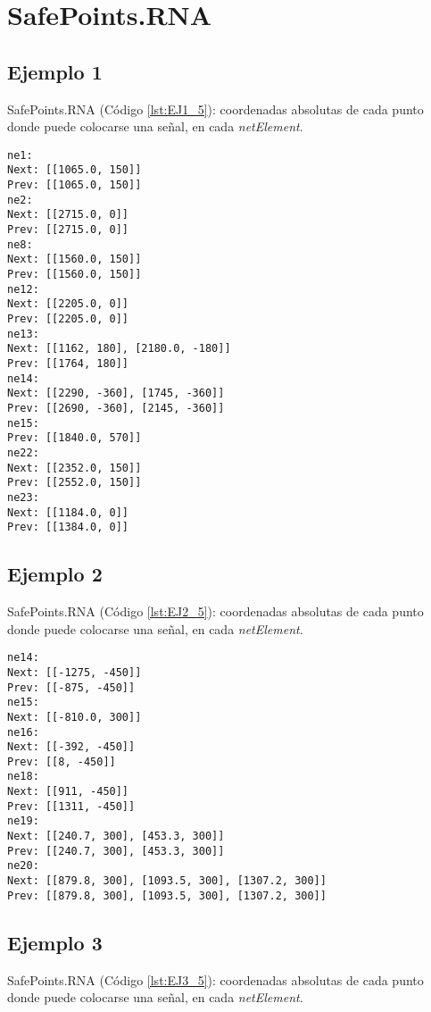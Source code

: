 \chapter{SafePoints.RNA}
	\label{sec:safePointsRNA}
	
	\section{Ejemplo 1}
		SafePoints.RNA (Código \ref{lst:EJ1_5}): coordenadas absolutas de cada punto donde puede colocarse una señal, en cada \textit{netElement}.
		
		\begin{lstlisting}[language = {}, caption = SafePoints.RNA, label = {lst:EJ1_5}]
ne1:
Next: [[1065.0, 150]]
Prev: [[1065.0, 150]]
ne2:
Next: [[2715.0, 0]]
Prev: [[2715.0, 0]]
ne8:
Next: [[1560.0, 150]]
Prev: [[1560.0, 150]]
ne12:
Next: [[2205.0, 0]]
Prev: [[2205.0, 0]]
ne13:
Next: [[1162, 180], [2180.0, -180]]
Prev: [[1764, 180]]
ne14:
Next: [[2290, -360], [1745, -360]]
Prev: [[2690, -360], [2145, -360]]
ne15:
Prev: [[1840.0, 570]]
ne22:
Next: [[2352.0, 150]]
Prev: [[2552.0, 150]]
ne23:
Next: [[1184.0, 0]]
Prev: [[1384.0, 0]]
		\end{lstlisting}	
	\section{Ejemplo 2}
	SafePoints.RNA (Código \ref{lst:EJ2_5}): coordenadas absolutas de cada punto donde puede colocarse una señal, en cada \textit{netElement}.
	
	\begin{lstlisting}[language = {}, caption = SafePoints.RNA, label = {lst:EJ2_5}]
ne14:
Next: [[-1275, -450]]
Prev: [[-875, -450]]
ne15:
Next: [[-810.0, 300]]
ne16:
Next: [[-392, -450]]
Prev: [[8, -450]]
ne18:
Next: [[911, -450]]
Prev: [[1311, -450]]
ne19:
Next: [[240.7, 300], [453.3, 300]]
Prev: [[240.7, 300], [453.3, 300]]
ne20:
Next: [[879.8, 300], [1093.5, 300], [1307.2, 300]]
Prev: [[879.8, 300], [1093.5, 300], [1307.2, 300]]
	\end{lstlisting}	
	\section{Ejemplo 3}
SafePoints.RNA (Código \ref{lst:EJ3_5}): coordenadas absolutas de cada punto donde puede colocarse una señal, en cada \textit{netElement}.

